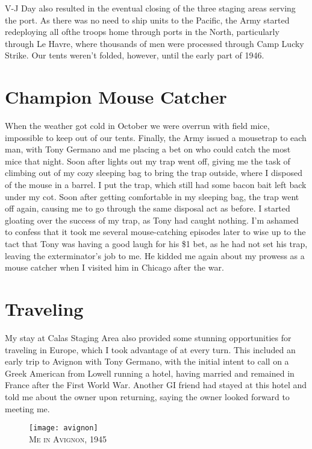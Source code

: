 \documentclass[../m3y]{subfiles}
\begin{document}
V-J Day also resulted in the eventual closing of the three staging areas serving the port. As there was no need to ship units to the Pacific, the Army started redeploying all ofthe troops home through ports in the North, particularly through Le Havre, where thousands of men were processed through Camp Lucky Strike. Our tents weren't folded, however, until the early part of 1946.

\section{Champion Mouse Catcher}
When the weather got cold in October we were overrun with field mice, impossible to keep out of our tents. Finally, the Army issued a mousetrap to each man, with Tony Germano and me placing a bet on who could catch the most mice that night. Soon after lights out my trap went off, giving me the task of climbing out of my cozy sleeping bag to bring the trap outside, where I disposed of the mouse in a barrel. I put the trap, which still had some bacon bait left back under my cot. Soon after getting comfortable in my sleeping bag, the trap went off again, causing me to go through the same disposal act as before. I started gloating over the success of my trap, as Tony had caught nothing. I'm ashamed to confess that it took me several mouse-catching episodes later to wise up to the tact that Tony was having a good laugh for his \$1 bet, as he had not set his trap, leaving the exterminator's job to me. He kidded me again about my prowess as a mouse catcher when I visited him in Chicago after the war.

\section{Traveling}
My stay at Calas Staging Area also provided some stunning opportunities for traveling in Europe, which I took advantage of at every turn. This included an early trip to Avignon with Tony Germano, with the initial intent to call on a Greek American from Lowell running a hotel, having married and remained in France after the First World War. Another GI friend had stayed at this hotel and told me about the owner upon returning, saying the owner looked forward to meeting me.

\begin{figure}[h]
\centering
\texttt{[image: avignon]}\\
\medskip
{\newtimes\textsc{Me in Avignon, 1945}}
\end{figure}
\end{document}
